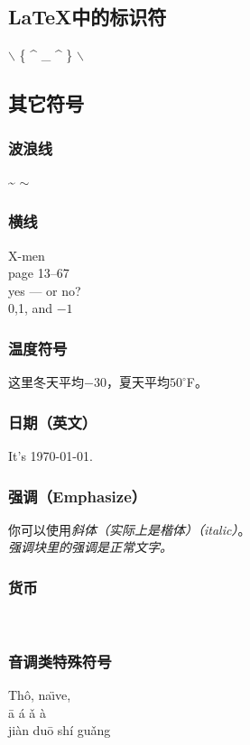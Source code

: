 \documentclass[12pt]{article}
\begin{document}
\subsection{\LaTeX 中的标识符}
$\backslash$ \{ \^{} \_{} \^{} \} $\backslash$

\subsection{其它符号}
\subsubsection{波浪线}
\~{} \qquad $\sim$  %
\subsubsection{横线}
X-men \\
page 13--67\\
yes --- or no?\\
0,1, and $-1$

\subsubsection{温度符号}
这里冬天平均$-30$\textcelsius ，夏天平均$50^{\circ}$F。

\subsubsection{日期（英文）}
It's \today.

\subsubsection{强调（Emphasize）}
你可以使用\textsl{斜体（实际上是楷体）（italic）}。\\
\emph{强调块里的强调是\emph{正常}文字。}

\subsubsection{货币}
\texteuro \  \textdollar

\subsubsection{音调类特殊符号}
Th\^o, na\"\i ve,\\
\= a \' a \v a \` a \\
ji\` an du\= o sh\' i gu\v ang
\end{document}
